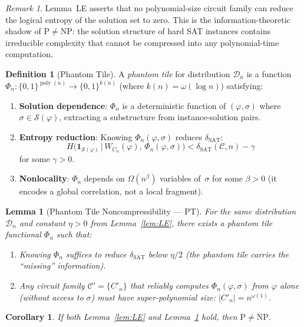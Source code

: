 \documentclass[11pt]{article}
\newtheorem{lemma}[theorem]{Lemma}
\newtheorem{corollary}[theorem]{Corollary}
\theoremstyle{definition}
\newtheorem{definition}[theorem]{Definition}
\theoremstyle{remark}
\newtheorem{remark}[theorem]{Remark}
\DeclareMathOperator{\poly}{poly}
\newcommand{\calC}{\mathcal{C}}
\newcommand{\calD}{\mathcal{D}}
\newcommand{\calS}{\mathcal{S}}
\newcommand{\dSAT}{\delta_{\mathrm{SAT}}}
\begin{document}
\begin{remark}
Lemma~LE asserts that no polynomial-size circuit family can reduce the
logical entropy of the solution set to zero.  This is the information-theoretic
shadow of $\mathrm{P} \neq \mathrm{NP}$: the solution structure of hard SAT
instances contains irreducible complexity that cannot be compressed into
any polynomial-time computation.
\end{remark}

\begin{definition}[Phantom Tile]
\label{def:phantom}
A \emph{phantom tile} for distribution $\calD_n$ is a function
$\Phi_n : \{0,1\}^{\poly(n)} \to \{0,1\}^{k(n)}$ (where $k(n) = \omega(\log n)$)
satisfying:
\begin{enumerate}
  \item \textbf{Solution dependence}: $\Phi_n$ is a deterministic function of
    $(\varphi, \sigma)$ where $\sigma \in \calS(\varphi)$, extracting a
    substructure from instance-solution pairs.
  \item \textbf{Entropy reduction}: Knowing $\Phi_n(\varphi, \sigma)$ reduces
    $\dSAT$:
    \[
      H\bigl(\mathbf{1}_{\calS(\varphi)} \,\big|\, W_{C_n}(\varphi),\, \Phi_n(\varphi, \sigma)\bigr)
      < \dSAT(\calC, n) - \gamma
    \]
    for some $\gamma > 0$.
  \item \textbf{Nonlocality}: $\Phi_n$ depends on $\Omega(n^\beta)$ variables
    of~$\sigma$ for some $\beta > 0$ (it encodes a global correlation, not
    a local fragment).
\end{enumerate}
\end{definition}

\begin{lemma}[Phantom Tile Noncompressibility --- PT]
\label{lem:PT}
For the same distribution $\calD_n$ and constant $\eta > 0$ from
Lemma~\ref{lem:LE}, there exists a phantom tile functional $\Phi_n$ such that:
\begin{enumerate}[label=(\alph*)]
  \item Knowing $\Phi_n$ suffices to reduce $\dSAT$ below $\eta/2$
    (the phantom tile carries the ``missing'' information).
  \item Any circuit family $\calC' = \{C'_n\}$ that reliably computes
    $\Phi_n(\varphi, \sigma)$ from $\varphi$ alone (without access to
    $\sigma$) must have super-polynomial size: $|C'_n| = n^{\omega(1)}$.
\end{enumerate}
\end{lemma}

\begin{corollary}
\label{cor:PneqNP}
If both Lemma~\ref{lem:LE} and Lemma~\ref{lem:PT} hold, then
$\mathrm{P} \neq \mathrm{NP}$.
\end{corollary}
\end{document}
